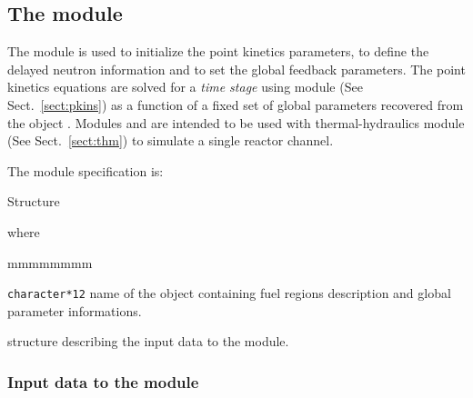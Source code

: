 \subsection{The  module}\label{sect:pkini}

\vskip 0.2cm
The  module is used to initialize the point kinetics parameters, to define the delayed neutron information
and to set the global feedback parameters. The point kinetics equations are solved for a {\sl time stage} using module
 (See Sect.~\ref{sect:pkins}) as a function of a fixed set of global parameters recovered from the  object .
Modules  and  are intended to be used with thermal-hydraulics module  (See Sect.~\ref{sect:thm})
to simulate a single reactor channel.

\vskip 0.08cm

\noindent
The  module specification is:

\begin{DataStructure}{Structure }
 \moc{:=}   \moc{::} 
\end{DataStructure}

\noindent where

\begin{ListeDeDescription}{mmmmmmmm}

\item[\dusa{MAPFL}] \texttt{character*12} name of the  
object containing fuel regions description and global parameter informations.

\item[\dstr{descpkini}] structure describing the input data to the  module. 

\end{ListeDeDescription}

\vskip 0.2cm

\subsubsection{Input data to the  module}\label{sect:pkinistr}

